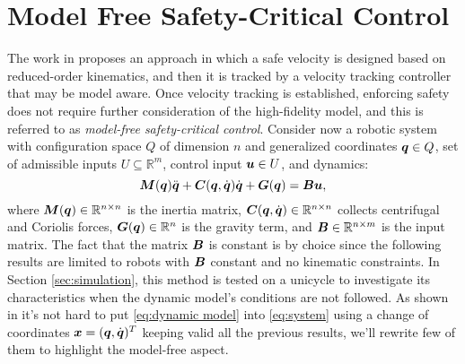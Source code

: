 \section{Model Free Safety-Critical Control}
The work in \cite{mfcbf} proposes an approach in which a safe velocity is designed based on reduced-order kinematics, and then it is tracked by a velocity tracking controller that may be model aware.
Once velocity tracking is established, enforcing safety does not require further consideration of the high-fidelity model, and this is referred to as \textit{model-free safety-critical control}.
Consider now a robotic system with configuration space $Q$
of dimension $n$ and 
generalized coordinates ${\boldsymbol{q}} \in Q$, set of admissible inputs $U\subseteq \mathbb{R}^m$, control input $\boldsymbol{u} \in U$, and dynamics:
\begin{equation} \label{eq:dynamic model}
    \boldsymbol{M}({\boldsymbol{q}})\ddot{{\boldsymbol{q}}}+\boldsymbol{C}({\boldsymbol{q}},\dot{{\boldsymbol{q}}})\dot{{\boldsymbol{q}}}+\boldsymbol{G}({\boldsymbol{q}})=\boldsymbol{B}\boldsymbol{u},
\end{equation}
where $\boldsymbol{M}({\boldsymbol{q}})\in\mathbb{R}^{n \times n}$ is the inertia matrix, $\boldsymbol{C}({\boldsymbol{q}},\dot{{\boldsymbol{q}}})\in\mathbb{R}^{n \times n}$ collects centrifugal and Coriolis forces, $\boldsymbol{G}({\boldsymbol{q}}) \in\mathbb{R}^{n}$ is the gravity term, and $\boldsymbol{B}\in\mathbb{R}^{n \times m}$ is the input matrix. The fact that the matrix $\boldsymbol{B}$ is constant is by choice since the following results are limited to robots with $\boldsymbol{B}$ constant and no kinematic constraints. In Section \ref{sec:simulation}, this method is tested on a unicycle to investigate its characteristics when the dynamic model's conditions are not followed. As shown in \cite{robbook} it's not hard to put \eqref{eq:dynamic model} into \eqref{eq:system} using a change of coordinates $\boldsymbol{x} = ({\boldsymbol{q}}, \dot{\boldsymbol{q}})^T$ keeping valid all the previous results, we'll rewrite few of them to highlight the model-free aspect.
